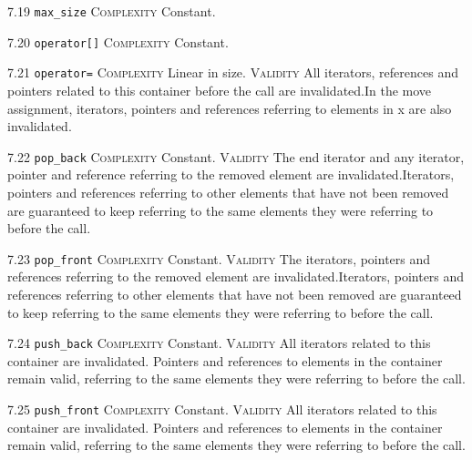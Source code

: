 \noindent\textcolor{cgreen}{7.19 \texttt{max\_size}} \textsc{Complexity} Constant. \vspace{0.5em}

\noindent\textcolor{cgreen}{7.20 \texttt{operator[]}} \textsc{Complexity} Constant. \vspace{0.5em}

\noindent\textcolor{corange}{7.21 \texttt{operator=}} \textsc{Complexity} Linear in size. \textsc{Validity} All iterators, references and pointers related to this container before the call are invalidated.In the move assignment, iterators, pointers and references referring to elements in x are also invalidated.\vspace{0.5em}

\noindent\textcolor{cgreen}{7.22 \texttt{pop\_back}} \textsc{Complexity} Constant. \textsc{Validity} The end iterator and any iterator, pointer and reference referring to the removed element are invalidated.Iterators, pointers and references referring to other elements that have not been removed are guaranteed to keep referring to the same elements they were referring to before the call.\vspace{0.5em}

\noindent\textcolor{cgreen}{7.23 \texttt{pop\_front}} \textsc{Complexity} Constant. \textsc{Validity} The iterators, pointers and references referring to the removed element are invalidated.Iterators, pointers and references referring to other elements that have not been removed are guaranteed to keep referring to the same elements they were referring to before the call.\vspace{0.5em}

\noindent\textcolor{cgreen}{7.24 \texttt{push\_back}} \textsc{Complexity} Constant. \textsc{Validity} All iterators related to this container are invalidated. Pointers and references to elements in the container remain valid, referring to the same elements they were referring to before the call.\vspace{0.5em}

\noindent\textcolor{cgreen}{7.25 \texttt{push\_front}} \textsc{Complexity} Constant. \textsc{Validity} All iterators related to this container are invalidated. Pointers and references to elements in the container remain valid, referring to the same elements they were referring to before the call.\vspace{0.5em}

